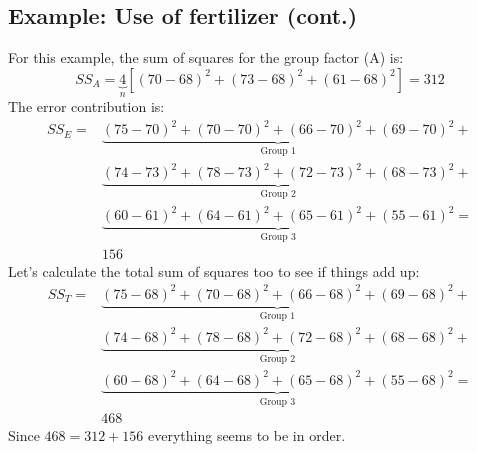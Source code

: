 \documentclass[12pt, a4paper]{article}
\begin{document}
\subsection{Example: Use of fertilizer (cont.)}
For this example, the sum of squares for the group factor (A) is:
\begin{equation}
SS_A=\underbrace{4}_{n}\left[(70-68)^2+(73-68)^2+(61-68)^2\right]=312
\end{equation}
The error contribution is:
\begin{align*}
SS_E = & \underbrace{(75-70)^2+(70-70)^2+(66-70)^2+(69-70)^2}_{\textrm{Group 1}} + \\
& \underbrace{(74-73)^2+(78-73)^2+(72-73)^2+(68-73)^2}_{\textrm{Group 2}} + \\
& \underbrace{(60-61)^2+(64-61)^2+(65-61)^2+(55-61)^2}_{\textrm{Group 3}} = \\
& 156
\end{align*}
Let's calculate the total sum of squares too to see if things add up:
\begin{align*}
SS_T = & \underbrace{(75-68)^2+(70-68)^2+(66-68)^2+(69-68)^2}_{\textrm{Group 1}} + \\
& \underbrace{(74-68)^2+(78-68)^2+(72-68)^2+(68-68)^2}_{\textrm{Group 2}} + \\
& \underbrace{(60-68)^2+(64-68)^2+(65-68)^2+(55-68)^2}_{\textrm{Group 3}} = \\
& 468
\end{align*}
Since $468=312+156$ everything seems to be in order.
\end{document}
